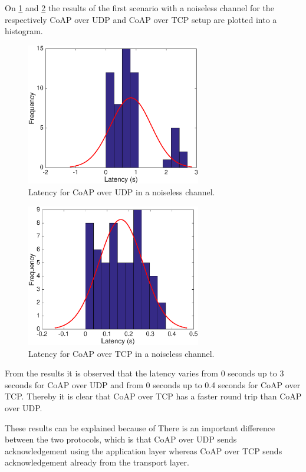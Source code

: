 On \figurename{\ref{fig:coapconlatency}} and \figurename{\ref{fig:coaptcplatency}} the results of the first scenario with a noiseless channel for the respectively CoAP over UDP and CoAP over TCP setup are plotted into a histogram. 
\begin{figure}[bht]
	\centering
	\includegraphics[width=3in]{gfx/coapoverudp}
	\caption{Latency for CoAP over UDP in a noiseless channel.}
	\label{fig:coapconlatency}
\end{figure}
\begin{figure}[bht]
	\centering
	\includegraphics[width=3in]{gfx/coapovertcp}
	\caption{Latency for CoAP over TCP in a noiseless channel.}
	\label{fig:coaptcplatency}
\end{figure}

From the results it is observed  that the latency varies from 0 seconds up to 3 seconds for CoAP over UDP and from 0 seconds up to 0.4 seconds for CoAP over TCP. Thereby it is clear that CoAP over TCP has a faster round trip than CoAP over UDP. 

These results can be explained because of 
There is an important difference between the two protocols, which is that CoAP over UDP sends acknowledgement using the application layer whereas CoAP over TCP sends acknowledgement already from the transport layer. 

